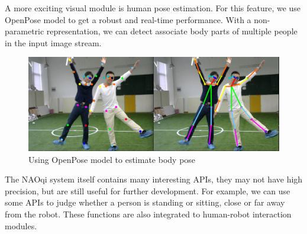 A more exciting visual module is human pose estimation. 
For this feature, we use OpenPose \cite{Cao_2017_CVPR} model to get a robust and real-time performance. 
With a non-parametric representation, we can detect associate body parts of multiple people in the input image stream. 
\begin{figure}[h!]
    \centering
    \includegraphics[width=1.\textwidth]{figs/vision2.png}
    \caption{Using OpenPose model to estimate body pose}
    \label{fig:vision2}
\end{figure}

The NAOqi system itself contains many interesting APIs, they may not have high precision, but are still useful for further development. 
For example, we can use some APIs to judge whether a person is standing or sitting, close or far away from the robot. 
These functions are also integrated to human-robot interaction modules.